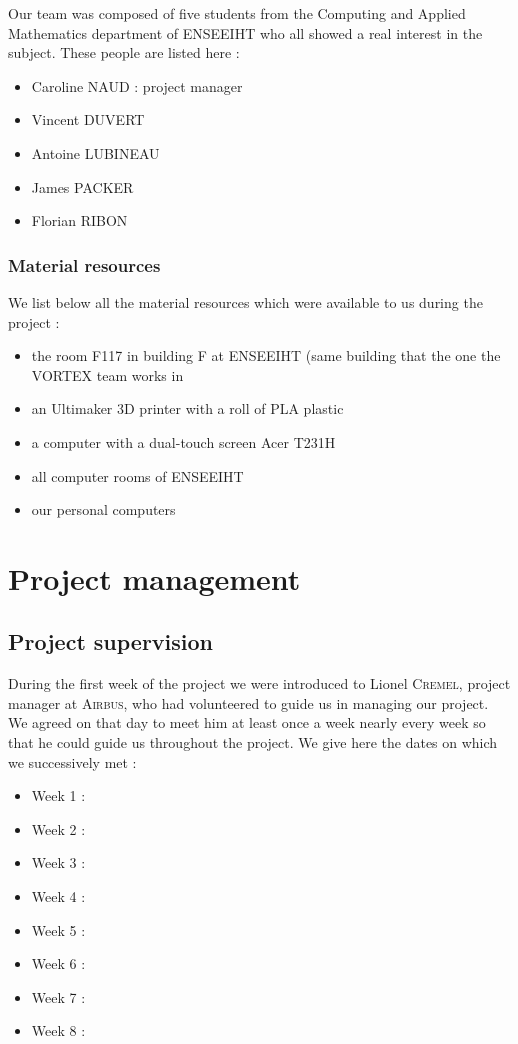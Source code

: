\documentclass{report}
\begin{document}
	Our team was composed of five students from the Computing and Applied Mathematics department of ENSEEIHT who all showed a real interest in the subject. These people are listed here :

\begin{itemize}
\item Caroline \textsc{NAUD} : project manager
\item Vincent \textsc{DUVERT}
\item Antoine \textsc{LUBINEAU}
\item James \textsc{PACKER}
\item Florian \textsc{RIBON}
\end{itemize}

\subsection{Material resources}

	We list below all the material resources which were available to us during the project :

\begin{itemize}
\item the room F117 in building F at ENSEEIHT (same building that the one the \textsc{VORTEX} team works in
\item an Ultimaker 3D printer with a roll of PLA plastic
\item a computer with a dual-touch screen Acer T231H
\item all computer rooms of ENSEEIHT
\item our personal computers
\end{itemize}

\chapter{Project management}

\section{Project supervision}

	During the first week of the project we were introduced to Lionel \textsc{Cremel}, project manager at \textsc{Airbus}, who had volunteered to guide us in managing our project. We agreed on that day to meet him at least once a week nearly every week so that he could guide us throughout the project. We give here the dates on which we successively met :
	
\begin{itemize}
\item Week 1 : 
\item Week 2 :
\item Week 3 :
\item Week 4 :
\item Week 5 :
\item Week 6 :
\item Week 7 :
\item Week 8 :
\end{itemize}
\end{document}
